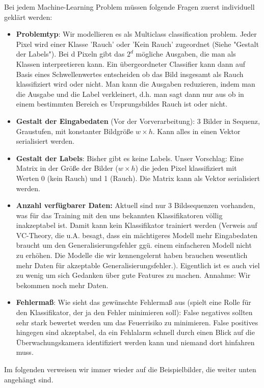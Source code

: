 \documentclass{article}
\begin{document}
Bei jedem Machine-Learning Problem müssen folgende Fragen zuerst individuell geklärt werden:
\begin{itemize}
\item \textbf{Problemtyp}: Wir modellieren es als Multiclass classification problem. Jeder Pixel wird einer Klasse 'Rauch' oder 'Kein Rauch' zugeordnet (Siehe "Gestalt der Labels"). Bei d Pixeln gibt das $2^d$ mögliche Ausgaben, die man als Klassen interpretieren kann. Ein übergeordneter Classifier kann dann auf Basis eines Schwellenwertes entscheiden ob das Bild insgesamt als Rauch klassifiziert wird oder nicht. Man kann die Ausgaben reduzieren, indem man die Ausgabe und die Label verkleinert, d.h. man sagt dann nur aus ob in einem bestimmten Bereich es Ursprungsbildes Rauch ist oder nicht.
\item \textbf{Gestalt der Eingabedaten} (Vor der Vorverarbeitung): 3 Bilder in Sequenz, Graustufen, mit konstanter Bildgröße $w \times h$. Kann alles in einen Vektor serialisiert werden.
\item \textbf{Gestalt der Labels}: Bisher gibt es keine Labels. Unser Vorschlag: Eine Matrix in der Größe der Bilder ($w \times h$) die jeden Pixel klassifiziert mit Werten 0 (kein Rauch) und 1 (Rauch). Die Matrix kann als Vektor serialisiert werden.
\item \textbf{Anzahl verfügbarer Daten:} Aktuell sind nur 3 Bildsequenzen vorhanden, was für das Training mit den uns bekannten Klassifikatoren völlig inakzeptabel ist. Damit kann kein Klassifikator trainiert werden (Verweis auf VC-Theory, die u.A. besagt, dass ein mächtigeres Modell mehr Eingabedaten braucht um den Generalisierungsfehler ggü. einem einfacheren Modell nicht zu erhöhen. Die Modelle die wir kennengelernt haben brauchen wesentlich mehr Daten für akzeptable Generalisierungsfehler.). Eigentlich ist es auch viel zu wenig um sich Gedanken über gute Features zu machen. Annahme: Wir bekommen noch mehr Daten.
\item \textbf{Fehlermaß}: Wie sieht das gewünschte Fehlermaß aus (spielt eine Rolle für den Klassifikator, der ja den Fehler minimieren soll): False negatives sollten sehr stark bewertet werden um das Feuerrisiko zu minimieren. False positives hingegen sind akzeptabel, da ein Fehlalarm schnell durch einen Blick auf die Überwachungskamera identifiziert werden kann und niemand dort hinfahren muss.
\end{itemize}

Im folgenden verweisen wir immer wieder auf die Beispielbilder, die weiter unten angehängt sind.
\end{document}
